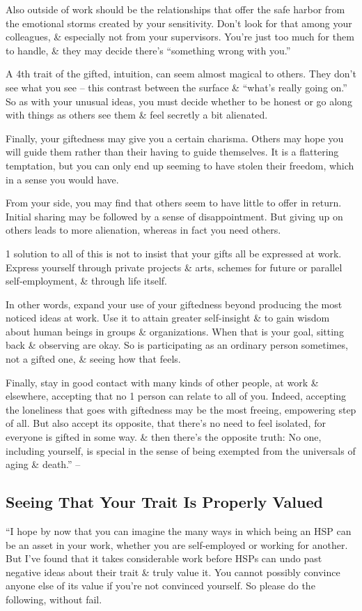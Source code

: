 \documentclass{article}
\numberwithin{equation}{section}
\begin{document}
Also outside of work should be the relationships that offer the safe harbor from the emotional storms created by your sensitivity. Don't look for that among your colleagues, \& especially not from your supervisors. You're just too much for them to handle, \& they may decide there's ``something wrong with you.''

A 4th trait of the gifted, intuition, can seem almost magical to others. They don't see what you see -- this contrast between the surface \& ``what's really going on.'' So as with your unusual ideas, you must decide whether to be honest or go along with things as others see them \& feel secretly a bit alienated.

Finally, your giftedness may give you a certain charisma. Others may hope you will guide them rather than their having to guide themselves. It is a flattering temptation, but you can only end up seeming to have stolen their freedom, which in a sense you would have.

From your side, you may find that others seem to have little to offer in return. Initial sharing may be followed by a sense of disappointment. But giving up on others leads to more alienation, whereas in fact you need others.

1 solution to all of this is not to insist that your gifts all be expressed at work. Express yourself through private projects \& arts, schemes for future or parallel self-employment, \& through life itself.

In other words, expand your use of your giftedness beyond producing the most noticed ideas at work. Use it to attain greater self-insight \& to gain wisdom about human beings in groups \& organizations. When that is your goal, sitting back \& observing are okay. So is participating as an ordinary person sometimes, not a gifted one, \& seeing how that feels.

Finally, stay in good contact with many kinds of other people, at work \& elsewhere, accepting that no 1 person can relate to all of you. Indeed, accepting the loneliness that goes with giftedness may be the most freeing, empowering step of all. But also accept its opposite, that there's no need to feel isolated, for everyone is gifted in some way. \& then there's the opposite truth: No one, including yourself, is special in the sense of being exempted from the universals of aging \& death.'' -- \cite[pp. 159--162]{Aron2013}

\subsection{Seeing That Your Trait Is Properly Valued}
``I hope by now that you can imagine the many ways in which being an HSP can be an asset in your work, whether you are self-employed or working for another. But I've found that it takes considerable work before HSPs can undo past negative ideas about their trait \& truly value it. You cannot possibly convince anyone else of its value if you're not convinced yourself. So please do the following, without fail.
\end{document}
